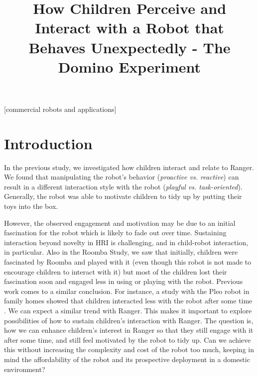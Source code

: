 \documentclass{sig-alternate}
\title{\LARGE \bf
How Children Perceive and Interact with a Robot that Behaves Unexpectedly - The Domino Experiment
}
\begin{document}
\maketitle
\begin{abstract}

\end{abstract}

[commercial robots and applications]



\section{Introduction}

In the previous study, we investigated how children interact and relate to
Ranger. We found that manipulating the robot's behavior (\textit{proactive vs.
reactive}) can result in a different interaction style with the robot
(\textit{playful vs. task-oriented}). Generally, the robot was able to motivate
children to tidy up by putting their toys into the box.  

However, the observed engagement and motivation may be due to an initial
fascination for the robot which is likely to fade out over time. Sustaining
interaction beyond novelty in HRI is challenging, and in child-robot
interaction, in particular. Also in the Roomba Study, we saw that initially,
children were fascinated by Roomba and played with it (even though this robot is
not made to encourage children to interact with it) but most of the children
lost their fascination soon and engaged less in using or playing with the robot.
Previous work comes to a similar conclusion. For instance, a study with the Pleo
robot in family homes showed that children interacted less with the robot after
some time \cite{fernaeus_how_2010}. We can expect a similar trend with Ranger.
This makes it important to explore possibilities of how to sustain children's
interaction with Ranger. The question is, how we can enhance children's interest
in Ranger so that they still engage with it after some time, and still feel
motivated by the robot to tidy up. Can we achieve this without increasing the
complexity and cost of the robot too much, keeping in mind the affordability of
the robot and its prospective deployment in a domestic environment?
\end{document}
